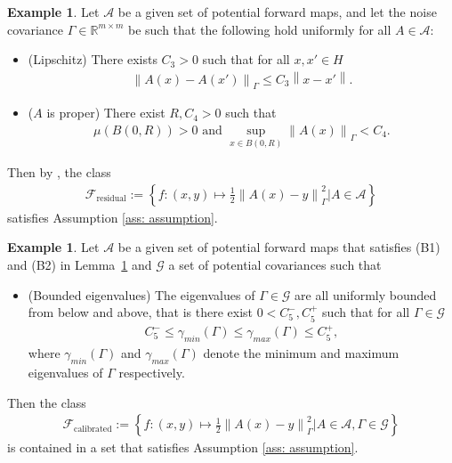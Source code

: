 \documentclass{amsart}
\theoremstyle{definition}
\newtheorem{example}[theorem]{Example}
\newcommand{\R}{{\mathbb R}}
\newcommand{\norm}[1]{\left\|#1\right\|}
\newcommand{\F}{\mathcal{F}}
\begin{document}
\begin{example}\label{ex: gaussian likelihood 1}
     Let $\mathcal{A}$ be a given set of potential forward maps, and let the noise covariance $\Gamma \in \R^{m \times m}$ be such that the following hold uniformly for all $A \in \mathcal{A}$:
    \begin{itemize}
        \item[(B1)] (Lipschitz) There exists $C_3 > 0$ such that for all $x, x' \in H$
        \begin{eqnarray*}
            \norm{A(x) - A(x')}_\Gamma  \le C_3 \norm{x - x'}.
        \end{eqnarray*}
        \item[(B2)] ($A$ is proper) There exist $R, C_4 > 0$ such that
        \begin{eqnarray*}
            \mu\left( B(0, R)\right) > 0 \text{ and } \sup\limits_{x \in B(0, R)} \norm{A(x)}_\Gamma < C_4.
        \end{eqnarray*}
    \end{itemize}
    Then by \cite[Lemma 3.10]{helin2025bayesianoptimalexperimentaldesign}, the class 
    \begin{eqnarray*}
        \F_{\text{residual}} := \left\{f: (x, y) \mapsto \frac{1}{2} \norm{A(x) -y }_\Gamma^2 \bigg| A \in \mathcal{A} \right\}
    \end{eqnarray*}
     satisfies Assumption \ref{ass: assumption}.
\end{example}
\begin{example}\label{cor: assumptions}
    Let $\mathcal{A}$ be a given set of potential forward maps that satisfies (B1) and (B2) in Lemma~\ref{ex: gaussian likelihood 1} and $\mathcal{G}$ a set of potential covariances such that 
    \begin{itemize}
        \item[(B3)] (Bounded eigenvalues) The eigenvalues of $\Gamma \in \mathcal{G}$ are all uniformly bounded from below and above, that is there exist $0 < C_5^-, C_5^+$ such that for all $\Gamma \in \mathcal{G}$\begin{eqnarray*}
        C_5^- \le \gamma_{min}(\Gamma) \le \gamma_{max}(\Gamma) \le C_5^+,
    \end{eqnarray*}
    where $\gamma_{min}(\Gamma)$ and $\gamma_{max}(\Gamma)$ denote the minimum and maximum eigenvalues of $\Gamma$ respectively.
    \end{itemize}
    Then the class
        \begin{eqnarray*}
        \F_{\text{calibrated}} := \left\{f: (x, y) \mapsto \frac{1}{2} \norm{A(x) -y }_\Gamma^2 \bigg| A \in \mathcal{A}, \Gamma \in \mathcal{G}\right\}
    \end{eqnarray*}
    is contained in a set that satisfies Assumption \ref{ass: assumption}.
\end{example}
\end{document}
